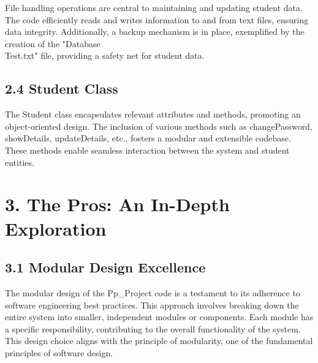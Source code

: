 \documentclass{article}
\begin{document}
File handling operations are central to maintaining and updating student data. 
The code efficiently reads and writes information to and from text files, ensuring data integrity. Additionally, a backup mechanism is in place, 
exemplified by the creation of the "Database\\Test.txt" file, providing a safety net for student data.

\subsection*{\textbf{2.4 Student Class}}

The Student class encapsulates relevant attributes and methods, promoting an object-oriented design. 
The inclusion of various methods such as changePassword, showDetails, updateDetails, etc., fosters a modular and extensible codebase. 
These methods enable seamless interaction between the system and student entities.

\section*{\textbf{\textbf{3. The Pros: An In-Depth Exploration}}}

\subsection*{\textbf{3.1 Modular Design Excellence}}

The modular design of the Pp\_Project code is a testament to its adherence to software engineering best practices. 
This approach involves breaking down the entire system into smaller, independent modules or components. 
Each module has a specific responsibility, contributing to the overall functionality of the system. 
This design choice aligns with the principle of modularity, one of the fundamental principles of software design.
\end{document}
